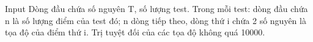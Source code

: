 Input  
Dòng đầu chứa số nguyên T, số lượng test. Trong mỗi test: dòng đầu chứa n là số lượng điểm của test đó; n dòng tiếp theo, dòng thứ i chứa 2 số nguyên là tọa độ của điểm thứ i. Trị tuyệt đối của các tọa độ không quá 10000.